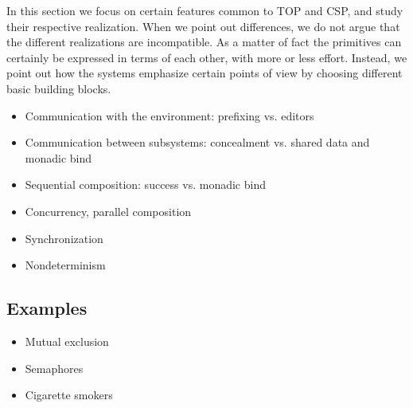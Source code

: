 In this section we focus on certain features common to TOP and CSP, and study their respective realization.
When we point out differences, we do not argue that the different realizations are incompatible.
As a matter of fact the primitives can certainly be expressed in terms of each other, with more or less effort.
Instead, we point out how the systems emphasize certain points of view by choosing different basic building blocks.

\begin{itemize}
\item Communication with the environment: prefixing vs. editors
\item Communication between subsystems: concealment vs. shared data and monadic bind
\item Sequential composition: success vs. monadic bind
\item Concurrency, parallel composition
\item Synchronization
\item Nondeterminism
\end{itemize}

\subsection{Examples}

\begin{itemize}
\item Mutual exclusion
\item Semaphores
\item Cigarette smokers
\end{itemize}
